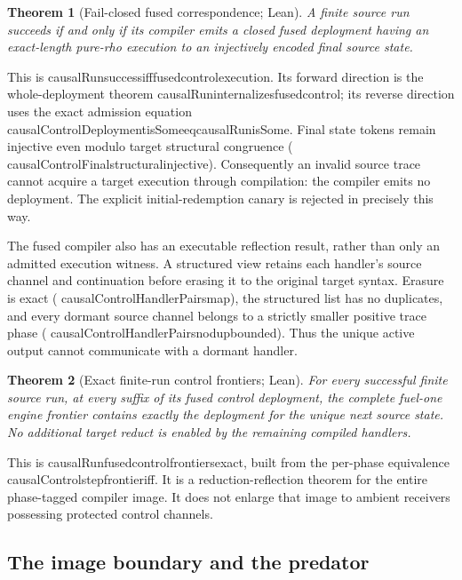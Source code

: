 \documentclass[11pt]{article}
\newtheorem{theorem}{Theorem}[section]
\newcommand{\leanname}[1]{{\scriptsize\ttfamily
  \def\_{\textunderscore\allowbreak}#1}}
\begin{document}
\begin{theorem}[Fail-closed fused correspondence; Lean]
A finite source run succeeds if and only if its compiler emits a closed fused
deployment having an exact-length pure-rho execution to an injectively encoded
final source state.
\end{theorem}

This is
\leanname{causalRun\_success\_iff\_fused\_control\_execution}.  Its forward
direction is the whole-deployment theorem
\leanname{causalRun\_internalizes\_fused\_control}; its reverse direction uses
the exact admission equation
\leanname{causalControlDeployment\_isSome\_eq\_causalRun\_isSome}.  Final
state tokens remain injective even modulo target structural congruence
(\leanname{causalControlFinal\_structural\_injective}).  Consequently an
invalid source trace cannot acquire a target execution through compilation:
the compiler emits no deployment.  The explicit initial-redemption canary is
rejected in precisely this way.

The fused compiler also has an executable reflection result, rather than only
an admitted execution witness.  A structured view retains each handler's
source channel and continuation before erasing it to the original target
syntax.  Erasure is exact
(\leanname{causalControlHandlerPairs\_map}), the structured list has no
duplicates, and every dormant source channel belongs to a strictly smaller
positive trace phase
(\leanname{causalControlHandlerPairs\_nodup\_bounded}).  Thus the unique
active output cannot communicate with a dormant handler.

\begin{theorem}[Exact finite-run control frontiers; Lean]
For every successful finite source run, at every suffix of its fused control
deployment, the complete fuel-one engine frontier contains exactly the
deployment for the unique next source state.  No additional target reduct is
enabled by the remaining compiled handlers.
\end{theorem}

This is \leanname{causalRun\_fused\_control\_frontiers\_exact}, built from the
per-phase equivalence \leanname{causalControl\_step\_frontier\_iff}.  It is a
reduction-reflection theorem for the entire phase-tagged compiler image.  It
does not enlarge that image to ambient receivers possessing protected control
channels.

\subsection{The image boundary and the predator}
\end{document}
